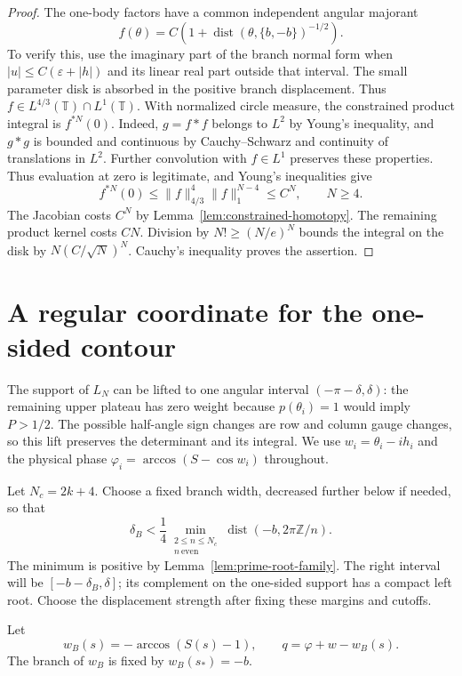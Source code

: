 \documentclass[11pt]{article}
\numberwithin{equation}{section}
\theoremstyle{remark}\newtheorem{remark}[theorem]{Remark}
\begin{document}
\begin{proof}
The one-body factors have a common independent angular majorant
\[
 f(\theta)=C\left(1+
  \operatorname{dist}(\theta,\{b,-b\})^{-1/2}\right).
\]
To verify this, use the imaginary part of the branch normal form
when $|u|\le C(\varepsilon+|h|)$ and its linear real part outside
that interval.  The small parameter disk is absorbed in the positive
branch displacement.  Thus $f\in L^{4/3}(\mathbb T)\cap L^1(\mathbb T)$.
With normalized circle measure, the constrained product integral is
$f^{*N}(0)$.  Indeed, $g=f*f$ belongs to $L^2$ by Young's
inequality, and $g*g$ is bounded and continuous by
Cauchy--Schwarz and continuity of translations in $L^2$.
Further convolution with $f\in L^1$ preserves these properties.
Thus evaluation at zero is legitimate, and Young's inequalities give
\[
 f^{*N}(0)\le \|f\|_{4/3}^{4}\|f\|_1^{N-4}\le C^N,
 \qquad N\ge4.
\]
The Jacobian costs $C^N$ by Lemma~\ref{lem:constrained-homotopy}.
The remaining product kernel costs $CN$.  Division by
$N!\ge(N/e)^N$ bounds the integral on the disk by
$N(C/\sqrt N)^N$.  Cauchy's inequality proves the assertion.
\end{proof}

\section{A regular coordinate for the one-sided contour}\label{sec:global-coordinate}


The support of $L_N$ can be lifted to one angular interval
$(-\pi-\delta,\delta)$: the remaining upper plateau has zero
weight because $p(\theta_i)=1$ would imply $P>1/2$.
The possible half-angle sign changes are row and column gauge
changes, so this lift preserves the determinant and its integral.
We use $w_i=\theta_i-ih_i$ and the physical phase
$\varphi_i=\arccos(S-\cos w_i)$ throughout.

Let $N_c=2k+4$. Choose a fixed branch width, decreased further
below if needed, so that
\begin{equation}\label{eq:finite-mean-exclusion}
 \delta_B<\frac14\min_{\substack{2\le n\le N_c\\n\ \mathrm{even}}}
       \operatorname{dist}(-b,2\pi\mathbb Z/n).
\end{equation}
The minimum is positive by Lemma~\ref{lem:prime-root-family}.
The right interval will be $[-b-\delta_B,\delta]$; its
complement on the one-sided support has a compact left root.
Choose the displacement strength after fixing these margins and cutoffs.

Let
\[
 w_B(s)=-\arccos(S(s)-1),\qquad
 q=\varphi+w-w_B(s).
\]
The branch of $w_B$ is fixed by $w_B(s_*)=-b$.
\end{document}
